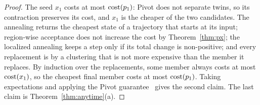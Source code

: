 \begin{proof}
The seed $x_1$ costs at most $\mathrm{cost}(p_1)$: Pivot does not separate twins, so its
contraction preserves its cost, and $x_1$ is the cheaper of the two
candidates.  The annealing returns the cheapest state of a trajectory that
starts at its input; region-wise acceptance does not increase the cost by
Theorem~\ref{thm:px}; the localized annealing keeps a step only if its total
change is non-positive; and every replacement is by a clustering that is not
more expensive than the member it replaces.  By induction over the
replacements, some member always costs at most $\mathrm{cost}(x_1)$, so the cheapest
final member costs at most $\mathrm{cost}(p_1)$.  Taking expectations and applying the
Pivot guarantee~\citep{AilonCN08} gives the second claim.  The last claim is
Theorem~\ref{thm:anytime}(a).
\end{proof}
